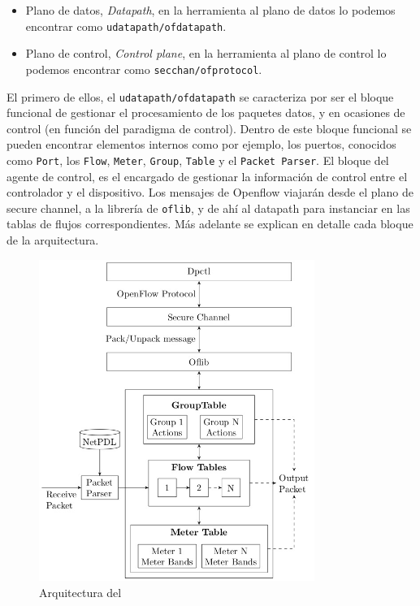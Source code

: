 \begin{itemize}
    \item   Plano de datos, \textit{Datapath}, en la herramienta al plano de datos lo podemos encontrar como \texttt{udatapath/ofdatapath}.
    \item   Plano de control, \textit{Control plane}, en la herramienta al plano de control lo podemos encontrar como \texttt{secchan/ofprotocol}.
\end{itemize}

El primero de ellos, el \texttt{udatapath/ofdatapath} se caracteriza por ser el bloque funcional de gestionar el procesamiento de los paquetes datos, y en ocasiones de control (en función del paradigma de control). Dentro de este bloque funcional se pueden encontrar elementos internos como por ejemplo, los puertos, conocidos como \texttt{Port}, los \texttt{Flow}, \texttt{Meter}, \texttt{Group}, \texttt{Table} y el \texttt{Packet Parser}. El bloque del agente de control, es el encargado de gestionar la información de control entre el controlador y el dispositivo. Los mensajes de Openflow viajarán desde el plano de secure channel, a la librería de \texttt{oflib}, y de ahí al datapath para instanciar en las tablas de flujos correspondientes. Más adelante se explican en detalle cada bloque de la arquitectura.

\begin{figure}[ht]
    \centering
    \includegraphics[width=0.8\textwidth]{archivos/img/teoria/bofuss2.png}
    \caption{Arquitectura del  \cite{fernandes2015software}}
    \label{fig:bofuss2}
\end{figure}


